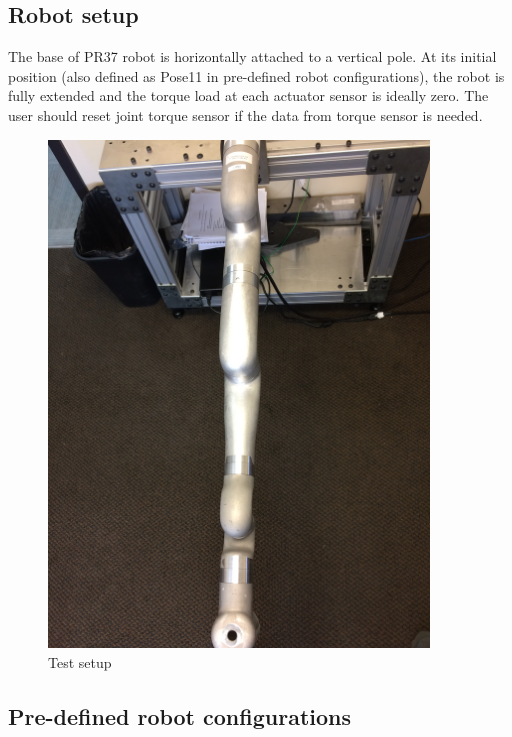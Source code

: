 
\subsection{Robot setup}

The base of PR37 robot is horizontally attached to a vertical pole. At its initial position (also defined as Pose11 in pre-defined robot configurations), the robot is fully extended and the torque load at each actuator sensor is ideally zero. The user should reset joint torque sensor if the data from torque sensor is needed.

\begin{figure}
	\begin{center}
				\includegraphics[width=0.9\textwidth]{./images/Pose11}%
		\caption{Test setup}
		\label{fig:pose11}%
	\end{center}
\end{figure}


\subsection{Pre-defined robot configurations}

